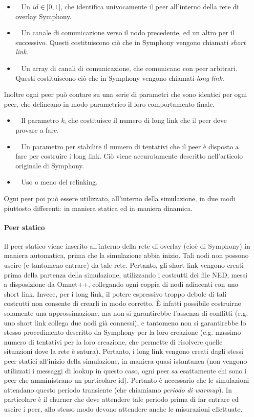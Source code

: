 \documentclass[prodmode,acmtap]{acmlarge}
\begin{document}
\begin{itemize}
	\item ~ Un $id \in [0,1[$, che identifica univocamente il peer all'interno della rete di overlay Symphony. 
	\item ~ Un canale di comunicazione verso il nodo precedente, ed un altro per il successivo. Questi costituiscono ciò che in Symphony vengono chiamati \textit{short link}.
	\item ~ Un array di canali di comunicazione, che comunicano con peer arbitrari. Questi costituiscono ciò che in Symphony vengono chiamati \textit{long link}.
\end{itemize}

Inoltre ogni peer può contare su una serie di parametri che sono identici per ogni peer, che delineano in modo parametrico il loro comportamento finale.

\begin{itemize}
	\item ~ Il parametro \textit{k}, che costituisce il numero di long link che il peer deve provare a fare.
	\item ~ Un parametro per stabilire il numero di tentativi che il peer è disposto a fare per costruire i long link. Ciò viene accuratamente descritto nell'articolo originale di Symphony.
	\item ~ Uso o meno del relinking.
\end{itemize}

Ogni peer poi può essere utilizzato, all'interno della simulazione, in due modi piuttosto differenti: in maniera statica ed in maniera dinamica. 

\paragraph{Peer statico}
Il peer statico viene inserito all'interno della rete di overlay (cioè di Symphony) in maniera automatica, prima che la simulazione abbia inizio. Tali nodi non possono uscire (e tantomeno entrare) da tale rete. Pertanto, gli short link vengono creati prima della partenza della simulazione, utilizzando i costrutti dei file NED, messi a disposizione da Omnet++, collegando ogni coppia di nodi adiacenti con uno short link. Invece, per i long link, il potere espressivo troppo debole di tali costrutti non consente di crearli in modo corretto. È infatti possibile costruirne solamente una approssimazione, ma non si garantirebbe l'assenza di conflitti (e.g. uno short link collega due nodi già connessi), e tantomeno non si garantirebbe lo stesso procedimento descritto da Symphony per la loro creazione (e.g. massimo numero di tentativi per la loro creazione, che permette di risolvere quelle situazioni dove la rete è satura). Pertanto, i long link vengono creati dagli stessi peer statici all'inizio della simulazione, in maniera quasi istantanea (non vengono utilizzati i messaggi di lookup in questo caso, ogni peer sa esattamente chi sono i peer che amministrano un particolare id). Pertanto è necessario che le simulazioni attendano questo periodo transiente (che chiamiamo \textit{periodo di warmup}). In particolare è il churner che deve attendere tale periodo prima di far entrare ed uscire i peer, allo stesso modo devono attendere anche le misurazioni effettuate.
\end{document}

